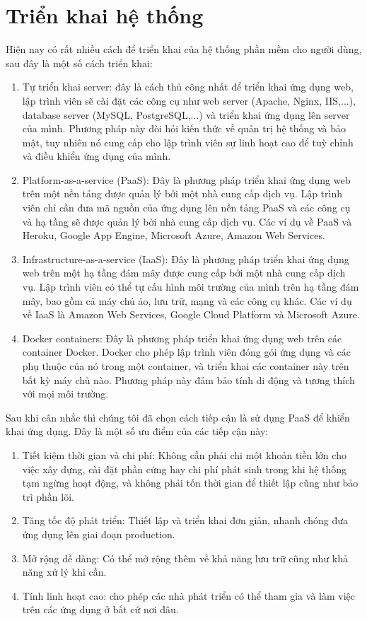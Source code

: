\section{Triển khai hệ thống}
Hiện nay có rất nhiều cách để triển khai của hệ thống phần mềm cho người dùng, sau đây là một số cách triển khai:
\begin{enumerate}
    \item Tự triển khai server: đây là cách thủ công nhất để triển khai ứng dụng web, lập trình viên sẽ cài đặt các công cụ như web server (Apache, Nginx, IIS,...), database server (MySQL, PostgreSQL,...) và triển khai ứng dụng lên server của mình. Phương pháp này đòi hỏi kiến thức về quản trị hệ thống và bảo mật, tuy nhiên nó cung cấp cho lập trình viên sự linh hoạt cao để tuỳ chỉnh và điều khiển ứng dụng của mình.
    \item Platform-as-a-service (PaaS): Đây là phương pháp triển khai ứng dụng web trên một nền tảng được quản lý bởi một nhà cung cấp dịch vụ. Lập trình viên chỉ cần đưa mã nguồn của ứng dụng lên nền tảng PaaS và các công cụ và hạ tầng sẽ được quản lý bởi nhà cung cấp dịch vụ. Các ví dụ về PaaS và Heroku, Google App Engine, Microsoft Azure, Amazon Web Services.
    \item Infrastructure-as-a-service (IaaS): Đây là phương pháp triển khai ứng dụng web trên một hạ tầng đám mây được cung cấp bởi một nhà cung cấp dịch vụ. Lập trình viên có thể tự cấu hình môi trường của mình trên hạ tầng đám mây, bao gồm cả máy chủ ảo, lưu trữ, mạng và các công cụ khác. Các ví dụ về IaaS là Amazon Web Services, Google Cloud Platform và Microsoft Azure.
    \item Docker containers: Đây là phương pháp triển khai ứng dụng web trên các container Docker. Docker cho phép lập trình viên đóng gói ứng dụng và các phụ thuộc của nó trong một container, và triển khai các container này trên bất kỳ máy chủ nào. Phương pháp này đảm bảo tính di động và tương thích với mọi môi trường.
\end{enumerate}
Sau khi cân nhắc thì chúng tôi đã chọn cách tiếp cận là sử dụng PaaS để khiển khai ứng dụng. Đây là một số ưu điểm của các tiếp cận này: 
\begin{enumerate}
    \item Tiết kiệm thời gian và chi phí: Không cần phải chi một khoản tiền lớn cho việc xây dựng, cài đặt phần cứng hay chi phí phát sinh trong khi hệ thống tạm ngừng hoạt động, và không phải tốn thời gian để thiết lập cũng như bảo trì phần lõi.
    \item Tăng tốc độ phát triển: Thiết lập và triển khai đơn giản, nhanh chóng đưa ứng dụng lên giai đoạn production.
    \item Mở rộng dễ dàng: Có thể mở rộng thêm về khả năng lưu trữ cũng như khả năng xử lý khi cần.
    \item Tính linh hoạt cao: cho phép các nhà phát triển có thể tham gia và làm việc trên các ứng dụng ở bất cứ nơi đâu.
\end{enumerate}
